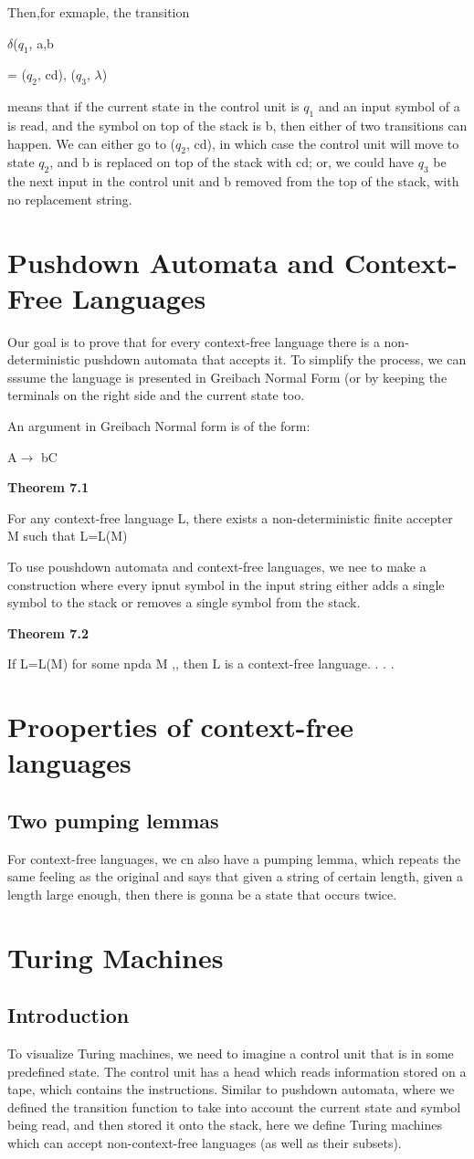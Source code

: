 \documentclass{article}
\begin{document}
Then,for exmaple, the transition

\centerline{$\delta$($q_1$, a,b}= {($q_2$, cd), ($q_3$, $\lambda$)}

means that if the current state in the control unit is $q_1$ and an input symbol of a is read, and the symbol on top of the stack
is b, then either of two transitions can happen. We can either go to ($q_2$, cd), in which case the control unit will move to 
state $q_2$, and b is replaced on top of the stack with cd; or, we could have $q_3$ be the next input in the control unit and b
removed from the top of the stack, with no replacement string.
\section{Pushdown Automata and Context-Free Languages}
Our goal is to prove that for every context-free language there is a non-deterministic pushdown automata that
accepts it. To simplify the process, we can sssume the language is presented in Greibach Normal Form (or by 
keeping the terminals on the right side and the current state too.

An argument in Greibach Normal form is of the form:
\centerline{A$\rightarrow$ bC}
\centerline{\textbf{Theorem 7.1}}
For any context-free language L, there exists a non-deterministic finite accepter M such that
L=L(M)

To use poushdown automata and context-free languages, we nee to make a construction where every ipnut symbol in
the input string either adds a single symbol to the stack or removes a single symbol from the stack.
\centerline{\textbf{Theorem 7.2}}
If L=L(M) for some npda M ,, then L is a context-free language.
.
.
.
\newpage
\section{Prooperties of context-free languages}
\subsection{Two pumping lemmas}
For context-free languages, we cn also have  a pumping lemma, which repeats the same feeling as the original
and says that given a string of certain length, given a length large enough, then there is gonna be a state
that occurs twice.
\section{Turing Machines}
\subsection{Introduction}
To visualize Turing machines, we need to imagine a control unit that is in some predefined state. The
control unit has a head which reads information stored on a tape, which contains the instructions. 
Similar to pushdown automata, where we defined the transition function to take into account the 
current state and symbol being read, and then stored it onto the stack, here we define Turing machines
which can accept non-context-free languages (as well as their subsets).
\end{document}
